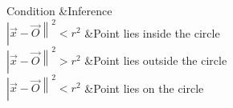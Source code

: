 \providecommand{\norm}[1]{\left\lvert#1\right\rVert}

Condition	&Inference\\ \hline
$\norm{\vec{x} - \vec{O}}^2 < r^2$	&Point lies inside the circle\\ \hline
$\norm{\vec{x} - \vec{O}}^2 > r^2$	&Point lies outside the circle\\ \hline
$\norm{\vec{x} - \vec{O}}^2 < r^2$	&Point lies on the circle\\ \hline
